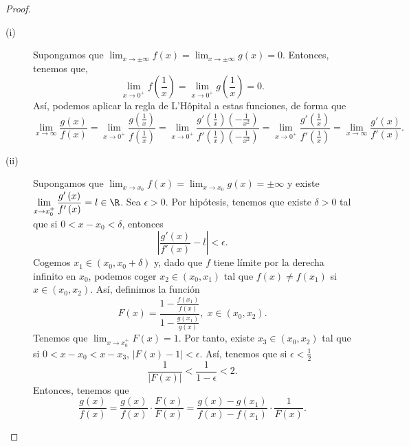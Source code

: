 \begin{proof}
\begin{description}
\item[(i)] Supongamos que $\displaystyle \lim_{x \to \pm \infty}f\left(x\right) = \lim_{x \to \pm \infty}g\left(x\right) = 0 $. Entonces, tenemos que,
	\[ \lim_{x \to 0^{+}}f\left(\frac{1}{x}\right) = \lim_{x \to 0^{+}}g\left(\frac{1}{x}\right) = 0 .\]
Así, podemos aplicar la regla de L'Hôpital a estas funciones, de forma que
\[ \lim_{x \to \infty}\frac{g\left(x\right)}{f\left(x\right)} = \lim_{x \to 0^{+}} \frac{g\left(\frac{1}{x}\right)}{f\left(\frac{1}{x}\right)} = \lim_{x \to 0^{+}}\frac{g'\left(\frac{1}{x}\right)\left(-\frac{1}{x^{2}}\right)}{f'\left(\frac{1}{x}\right)\left(-\frac{1}{x^{2}}\right)} = \lim_{x \to 0^{+}} \frac{g'\left(\frac{1}{x}\right)}{f'\left(\frac{1}{x}\right)} = \lim_{x \to \infty} \frac{g'\left(x\right)}{f'\left(x\right)}.\]
\item[(ii)] Supongamos que $\displaystyle \lim_{x \to x_{0}}f\left(x\right) = \lim_{x \to x_{0}}g\left(x\right) = \pm \infty $ y existe $\displaystyle \lim_{x \to x_{0}^{+}}\frac{g'\left(x\right)}{f'\left(x\right)} = l \in \R $. Sea $\displaystyle \epsilon > 0 $. Por hipótesis, tenemos que existe $\displaystyle \delta > 0 $ tal que si $\displaystyle 0 < x - x_{0} < \delta  $, entonces 
	\[ \left|\frac{g'\left(x\right)}{f'\left(x\right)} - l\right| < \epsilon .\]
Cogemos $\displaystyle x_{1} \in \left(x_{0}, x_{0} + \delta \right) $ y, dado que $\displaystyle f $ tiene límite por la derecha infinito en $\displaystyle x_{0} $, podemos coger $\displaystyle x_{2} \in \left(x_{0}, x_{1}\right) $ tal que  $\displaystyle f\left(x\right) \neq f\left(x_{1}\right) $ si $\displaystyle x \in \left(x_{0}, x_{2}\right) $. Así, definimos la función
\[ F\left(x\right) = \frac{1 - \frac{f\left(x_{1}\right)}{f\left(x\right)}}{1 - \frac{g\left(x_{1}\right)}{g\left(x\right)}}, \; x \in \left(x_{0}, x_{2}\right) .\]
Tenemos que $\displaystyle \lim_{x \to x_{0}^{+}}F\left(x\right) = 1 $. Por tanto, existe $\displaystyle x_{3} \in \left(x_{0}, x_{2}\right) $ tal que si $\displaystyle 0 < x - x_{0} < x - x_{3} $, $\displaystyle \left|F\left(x\right)-1\right|<\epsilon $. Así, tenemos que si $\displaystyle \epsilon < \frac{1}{2} $ 
\[ \frac{1}{ \left|F\left(x\right)\right|} < \frac{1}{1-\epsilon } < 2.\]
Entonces, tenemos que 
\[ \frac{g\left(x\right)}{f\left(x\right)} = \frac{g\left(x\right)}{f\left(x\right)} \cdot \frac{F\left(x\right)}{F\left(x\right)} = \frac{g\left(x\right)-g\left(x_{1}\right)}{f\left(x\right)-f\left(x_{1}\right)} \cdot \frac{1}{ F\left(x\right)} .\]

\end{description}
\end{proof}

